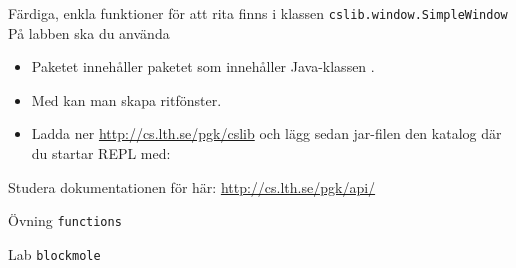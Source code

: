 \begin{Slide}{Färdiga, enkla funktioner för att rita finns i klassen \texttt{cslib.window.SimpleWindow}}
På labben ska du använda 
\begin{itemize}
\item Paketet  innehåller paketet  som innehåller Java-klassen .
\item Med  kan man skapa ritfönster. 
\item Ladda ner \url{http://cs.lth.se/pgk/cslib} och lägg sedan jar-filen den katalog där du startar REPL med: 
\end{itemize}
\pause
{}
\pause Studera dokumentationen för  här: \url{http://cs.lth.se/pgk/api/}
\end{Slide} 





\begin{Slide}{Övning \texttt{functions}}\SlideFontTiny
\setlength{\leftmargini}{0pt}
\begin{itemize}

\end{itemize}
\end{Slide} 


\begin{Slide}{Lab \texttt{blockmole}}%
\begin{itemize}

\end{itemize}

\end{Slide} 

